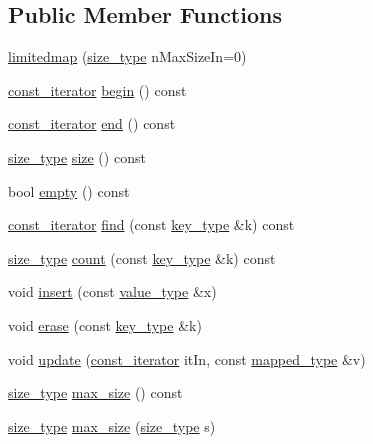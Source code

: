 \subsection*{Public Member Functions}
\begin{DoxyCompactItemize}
\item 
\hyperlink{classlimitedmap_a6670d7a262af3551de75658123b7cb60}{limitedmap} (\hyperlink{classlimitedmap_a1c564b323f94e182e56aa27975e5f9d1}{size\+\_\+type} n\+Max\+Size\+In=0)
\item 
\hyperlink{classlimitedmap_ab0a3e4f2ec7c82359300c83a35ae2500}{const\+\_\+iterator} \hyperlink{classlimitedmap_ac62161ce45bdbea636d30d1274cb2dc4}{begin} () const 
\item 
\hyperlink{classlimitedmap_ab0a3e4f2ec7c82359300c83a35ae2500}{const\+\_\+iterator} \hyperlink{classlimitedmap_ae5d896ca3733c0931ee21e6d0e9058de}{end} () const 
\item 
\hyperlink{classlimitedmap_a1c564b323f94e182e56aa27975e5f9d1}{size\+\_\+type} \hyperlink{classlimitedmap_a7eb0ffdae9db112f1d6f8cc757caae64}{size} () const 
\item 
bool \hyperlink{classlimitedmap_a982ef21b08ed6c74a1771a9253b4260a}{empty} () const 
\item 
\hyperlink{classlimitedmap_ab0a3e4f2ec7c82359300c83a35ae2500}{const\+\_\+iterator} \hyperlink{classlimitedmap_a4888d5aedd039a552a2fa663a5889bf5}{find} (const \hyperlink{classlimitedmap_aebf71255c65df699225cdcefe88717b9}{key\+\_\+type} \&k) const 
\item 
\hyperlink{classlimitedmap_a1c564b323f94e182e56aa27975e5f9d1}{size\+\_\+type} \hyperlink{classlimitedmap_a4ae35b60eacecac30ecf156382e663af}{count} (const \hyperlink{classlimitedmap_aebf71255c65df699225cdcefe88717b9}{key\+\_\+type} \&k) const 
\item 
void \hyperlink{classlimitedmap_af68570a54d74e1b168908be6e8cfb85c}{insert} (const \hyperlink{classlimitedmap_a8a6c4972e628b71bf43eeb757dafdce5}{value\+\_\+type} \&x)
\item 
void \hyperlink{classlimitedmap_aaf2fa41d8f7591d93e5010cf8c351de6}{erase} (const \hyperlink{classlimitedmap_aebf71255c65df699225cdcefe88717b9}{key\+\_\+type} \&k)
\item 
void \hyperlink{classlimitedmap_af29154e7161f1deeea268d0dcea464ab}{update} (\hyperlink{classlimitedmap_ab0a3e4f2ec7c82359300c83a35ae2500}{const\+\_\+iterator} it\+In, const \hyperlink{classlimitedmap_a8bd6b8e7f91f0a141c91c382b492c03c}{mapped\+\_\+type} \&v)
\item 
\hyperlink{classlimitedmap_a1c564b323f94e182e56aa27975e5f9d1}{size\+\_\+type} \hyperlink{classlimitedmap_a3a7d50647833bb8a60bb644f5525b9e0}{max\+\_\+size} () const 
\item 
\hyperlink{classlimitedmap_a1c564b323f94e182e56aa27975e5f9d1}{size\+\_\+type} \hyperlink{classlimitedmap_a97e3deba25cf9a59658cfc317507d45d}{max\+\_\+size} (\hyperlink{classlimitedmap_a1c564b323f94e182e56aa27975e5f9d1}{size\+\_\+type} s)
\end{DoxyCompactItemize}
